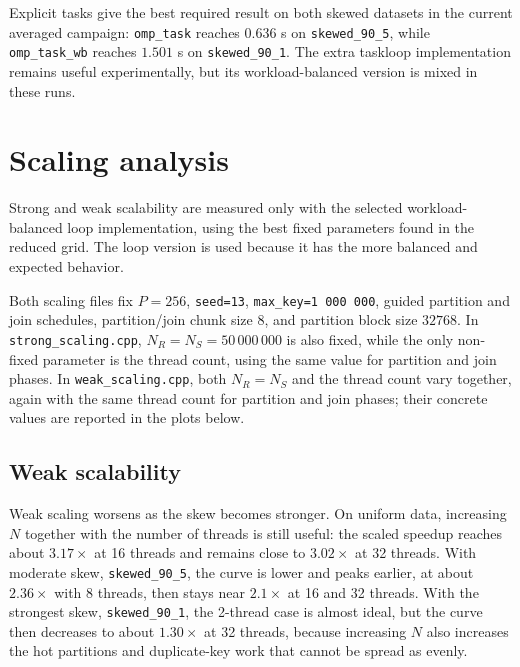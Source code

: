 \documentclass[11pt,a4paper]{article}
\begin{document}
Explicit tasks give the best required result on both skewed datasets in the current averaged campaign: \texttt{omp\_task} reaches \(0.636\) s on \texttt{skewed\_90\_5}, while \texttt{omp\_task\_wb} reaches \(1.501\) s on \texttt{skewed\_90\_1}. The extra taskloop implementation remains useful experimentally, but its workload-balanced version is mixed in these runs.


\section{Scaling analysis}
Strong and weak scalability are measured only with the selected workload-balanced loop implementation, using the best fixed parameters found in the reduced grid. The loop version is used because it has the more balanced and expected behavior.

Both scaling files fix \(P=256\), \texttt{seed=13}, \texttt{max\_key=1\,000\,000}, guided partition and join schedules, partition/join chunk size \(8\), and partition block size \(32768\). In \texttt{strong\_scaling.cpp}, \(N_R=N_S=50\,000\,000\) is also fixed, while the only non-fixed parameter is the thread count, using the same value for partition and join phases. In \texttt{weak\_scaling.cpp}, both \(N_R=N_S\) and the thread count vary together, again with the same thread count for partition and join phases; their concrete values are reported in the plots below.


\subsection{Weak scalability}
Weak scaling worsens as the skew becomes stronger. On uniform data, increasing \(N\) together with the number of threads is still useful: the scaled speedup reaches about \(3.17\times\) at 16 threads and remains close to \(3.02\times\) at 32 threads. With moderate skew, \texttt{skewed\_90\_5}, the curve is lower and peaks earlier, at about \(2.36\times\) with 8 threads, then stays near \(2.1\times\) at 16 and 32 threads. With the strongest skew, \texttt{skewed\_90\_1}, the 2-thread case is almost ideal, but the curve then decreases to about \(1.30\times\) at 32 threads, because increasing \(N\) also increases the hot partitions and duplicate-key work that cannot be spread as evenly.

\end{document}
